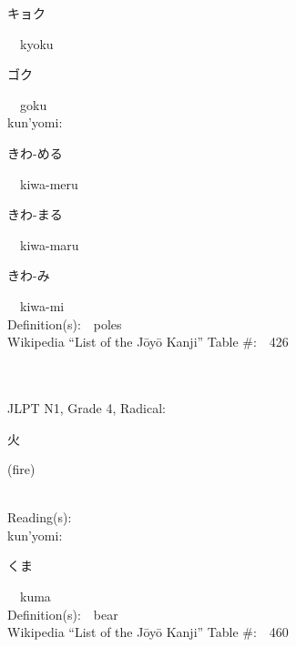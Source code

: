 \begin{multicols}{2}
{\hspace*{2em}}{\begin{CJK}{UTF8}{min} キョク \end{CJK}}\ \ kyoku\ \ \\
{\hspace*{2em}}{\begin{CJK}{UTF8}{min} ゴク \end{CJK}}\ \ goku\ \ \\
{\hspace*{1em}}kun'yomi:\ \ \\
{\hspace*{2em}}{\begin{CJK}{UTF8}{min} きわ-める \end{CJK}}\ \ kiwa-meru\ \ \\
{\hspace*{2em}}{\begin{CJK}{UTF8}{min} きわ-まる \end{CJK}}\ \ kiwa-maru\ \ \\
{\hspace*{2em}}{\begin{CJK}{UTF8}{min} きわ-み \end{CJK}}\ \ kiwa-mi\ \ \\
Definition(s):\ \ poles \\
Wikipedia ``List of the J\=oy\=o Kanji'' Table \#:\ \ 426 \\
\ \ \\
{\fontsize{34pt}{40pt}  }\ \ \\  %
{JLPT N1, Grade 4, Radical:\ \ {\begin{CJK}{UTF8}{min} 火 \end{CJK}} (fire) } \\
Reading(s):\ \ \\
{\hspace*{1em}}kun'yomi:\ \ \\
{\hspace*{2em}}{\begin{CJK}{UTF8}{min} くま \end{CJK}}\ \ kuma\ \ \\
Definition(s):\ \ bear \\
Wikipedia ``List of the J\=oy\=o Kanji'' Table \#:\ \ 460 \\
\ \ \\
{\fontsize{34pt}{40pt}  }\ \ \\  %

\end{multicols}
